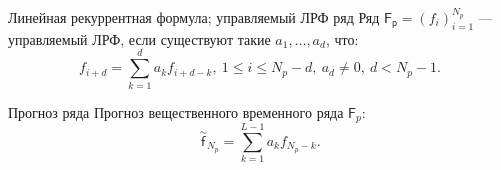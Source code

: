 \documentclass[ucs, notheorems, handout]{beamer}
\begin{document}
\begin{frame}
    \begin{block}{Линейная рекуррентная формула; управляемый ЛРФ ряд}
        Ряд $\mathsf{F_p} = (f_i)_{i=1}^{N_p}$ --- управляемый ЛРФ, если существуют такие $a_1, \dotso, a_d$, что:
        $$f_{i+d} = \sum_{k=1}^d a_k f_{i+d-k},\ 1 \leq i \leq N_p - d,\ a_d \neq 0,\ d < N_p - 1.$$
    \end{block}

    
    \begin{block}{Прогноз ряда}
        Прогноз вещественного временного ряда $\mathsf{F}_p$:
        $$\overset{\sim}{\mathsf{f}}_{N_p} = \sum_{k=1}^{L-1} a_k f_{N_p-k}.$$
    \end{block}

\end{frame}
\end{document}
